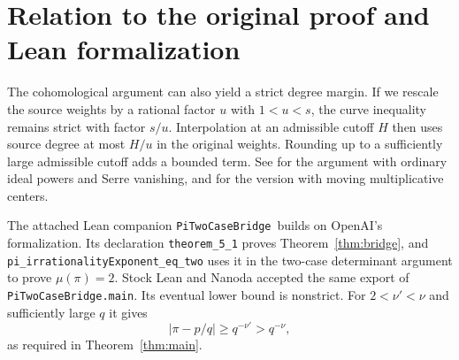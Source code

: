 \documentclass[11pt]{article}
\theoremstyle{definition}
\theoremstyle{remark}
\numberwithin{equation}{section}
\begin{document}
\newpage
\section{Relation to the original proof and Lean formalization}
The cohomological argument can also yield a strict degree margin. If we
rescale the source weights by a rational factor \(u\) with \(1<u<s\),
the curve inequality remains strict with factor \(s/u\). Interpolation
at an admissible cutoff \(H\) then uses source degree at most \(H/u\)
in the original weights. Rounding up to a sufficiently large admissible
cutoff adds a bounded term. See \cite[Section~2.3]{openai} for the
argument with ordinary ideal powers and Serre vanishing, and
\cite[Section~5.4]{chudnovsky} for the version with moving
multiplicative centers.

The attached Lean companion \texttt{PiTwoCaseBridge}\,
builds on OpenAI's formalization. Its declaration \texttt{theorem\_5\_1}
proves Theorem~\ref{thm:bridge}, and
\texttt{pi\_irrationalityExponent\_eq\_two} uses it in the two-case
determinant argument to prove \(\mu(\pi)=2\). Stock Lean and Nanoda
accepted the same export of
\texttt{PiTwoCaseBridge.main}. Its eventual lower bound is nonstrict.
For \(2<\nu'<\nu\) and sufficiently large \(q\) it gives
\[
 |\pi-p/q|\ge q^{-\nu'}>q^{-\nu},
\]
as required in Theorem~\ref{thm:main}.
\end{document}
